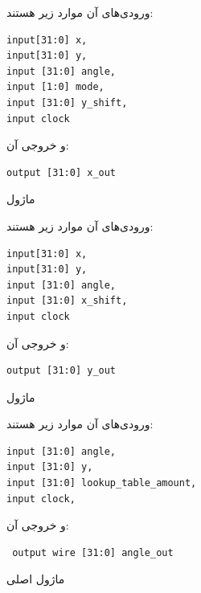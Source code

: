 \documentclass[12pt,titlepage,a4page , tikz , multi,table , svgnames,xcdraw]{article}
\begin{document}
 
 ورودی‌های آن موارد زیر هستند:

\begin{latin}
\begin{verbatim}
input[31:0] x,
input[31:0] y,
input [31:0] angle,
input [1:0] mode,
input [31:0] y_shift,
input clock
\end{verbatim}
\end{latin}

و خروجی آن:

\begin{latin}
\begin{verbatim}
output [31:0] x_out
\end{verbatim}
\end{latin}


\hrulefill
 

ماژول  
 
 ورودی‌های آن موارد زیر هستند:

\begin{latin}
\begin{verbatim}
input[31:0] x,
input[31:0] y,
input [31:0] angle,
input [31:0] x_shift,
input clock
\end{verbatim}
\end{latin}

و خروجی آن:

\begin{latin}
\begin{verbatim}
output [31:0] y_out
\end{verbatim}
\end{latin}


\hrulefill


ماژول 

 
 ورودی‌های آن موارد زیر هستند:

\begin{latin}
\begin{verbatim}
input [31:0] angle,
input [31:0] y,
input [31:0] lookup_table_amount,
input clock,
\end{verbatim}
\end{latin}

و خروجی آن:

\begin{latin}
\begin{verbatim}
 output wire [31:0] angle_out
\end{verbatim}
\end{latin}

\hrulefill


 ماژول اصلی   
\end{document}
